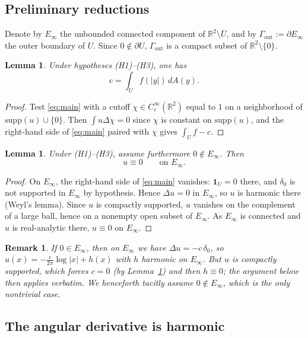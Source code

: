 \documentclass[11pt]{article}
\newtheorem{lemma}[theorem]{Lemma}
\newtheorem{remark}[theorem]{Remark}
\newcommand{\R}{\mathbb R}
\newcommand{\1}{\mathbf 1}
\begin{document}
\subsection{Preliminary reductions}

Denote by $E_\infty$ the unbounded connected component of $\R^2\setminus\overline U$, and by
$\Gamma_{\mathrm{out}}:=\partial E_\infty$ the outer boundary of $U$. Since $0\notin\partial U$,
$\Gamma_{\mathrm{out}}$ is a compact subset of $\R^2\setminus\{0\}$.

\begin{lemma}\label{lem:c-eq}
Under hypotheses (H1)--(H3), one has
\[
c=\int_U f(|y|)\,dA(y).
\]
\end{lemma}

\begin{proof}
Test \eqref{eq:main} with a cutoff $\chi\in C_c^\infty(\R^2)$ equal to $1$ on a neighborhood
of $\mathrm{supp}(u)\cup\{0\}$. Then $\int u\Delta\chi=0$ since $\chi$ is constant on
$\mathrm{supp}(u)$, and the right-hand side of \eqref{eq:main} paired with $\chi$ gives
$\int_U f-c$.
\end{proof}

\begin{lemma}\label{lem:vanish-Einfty}
Under (H1)--(H3), assume furthermore $0\notin E_\infty$. Then
\[
u\equiv 0\qquad\text{on }E_\infty.
\]
\end{lemma}

\begin{proof}
On $E_\infty$, the right-hand side of \eqref{eq:main} vanishes: $\1_U=0$ there, and
$\delta_0$ is not supported in $E_\infty$ by hypothesis. Hence $\Delta u=0$ in $E_\infty$,
so $u$ is harmonic there (Weyl's lemma). Since $u$ is compactly supported, $u$ vanishes
on the complement of a large ball, hence on a nonempty open subset of $E_\infty$. As
$E_\infty$ is connected and $u$ is real-analytic there, $u\equiv 0$ on $E_\infty$.
\end{proof}

\begin{remark}
If $0\in E_\infty$, then on $E_\infty$ we have $\Delta u=-c\,\delta_0$, so
$u(x)=-\frac{c}{2\pi}\log|x|+h(x)$ with $h$ harmonic on $E_\infty$. But $u$ is compactly
supported, which forces $c=0$ (by Lemma~\ref{lem:c-eq}) and then $h\equiv 0$; the argument
below then applies verbatim. We henceforth tacitly assume $0\notin E_\infty$, which is the
only nontrivial case.
\end{remark}

\subsection{The angular derivative is harmonic}
\end{document}
